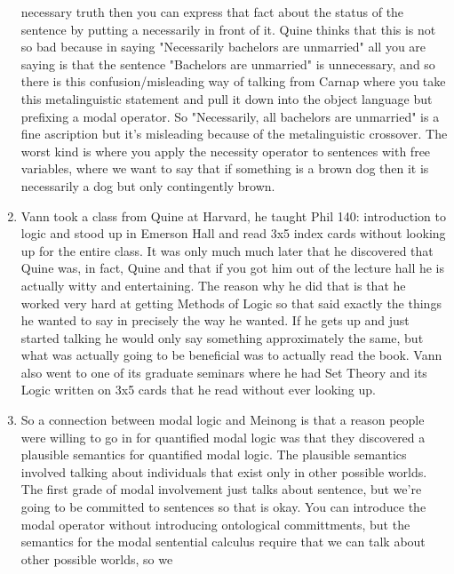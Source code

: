 \documentclass[12pt]{article}
\theoremstyle{definition}
\begin{document}
\begin{enumerate}
        necessary truth then you can express that fact about the status of the
        sentence by putting a necessarily in front of it. Quine thinks that
        this is not so bad because in saying "Necessarily bachelors are
        unmarried" all you are saying is that the sentence "Bachelors are
        unmarried" is unnecessary, and so there is this confusion/misleading
        way of talking from Carnap where you take this metalinguistic statement
        and pull it down into the object language but prefixing a modal
        operator. So "Necessarily, all bachelors are unmarried" is a fine
        ascription but it's misleading because of the metalinguistic crossover.
        The worst kind is where you apply the necessity operator to sentences
        with free variables, where we want to say that if something is a brown
        dog then it is necessarily a dog but only contingently brown.
    \item
        Vann took a class from Quine at Harvard, he taught Phil 140:
        introduction to logic and stood up in Emerson Hall and read 3x5 index
        cards without looking up for the entire class. It was only much much
        later that he discovered that Quine was, in fact, Quine and that if you
        got him out of the lecture hall he is actually witty and entertaining.
        The reason why he did that is that he worked very hard at getting
        Methods of Logic so that said exactly the things he wanted to say in
        precisely the way he wanted. If he gets up and just started talking he
        would only say something approximately the same, but what was actually
        going to be beneficial was to actually read the book. Vann also went to
        one of its graduate seminars where he had Set Theory and its Logic
        written on 3x5 cards that he read without ever looking up.
    \item
        So a connection between modal logic and Meinong is that a reason people
        were willing to go in for quantified modal logic was that they
        discovered a plausible semantics for quantified modal logic. The
        plausible semantics involved talking about individuals that exist only
        in other possible worlds. The first grade of modal involvement just
        talks about sentence, but we're going to be committed to sentences so
        that is okay. You can introduce the modal operator without introducing
        ontological committments, but the semantics for the modal sentential
        calculus require that we can talk about other possible worlds, so we

\end{enumerate}
\end{document}
